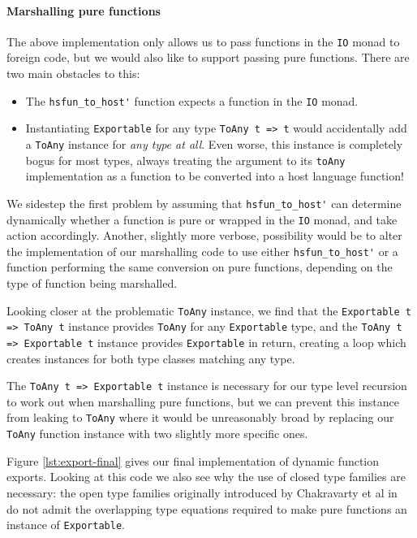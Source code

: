 \documentclass{sigplanconf}
\begin{document}
\paragraph{Marshalling pure functions}
The above implementation only allows us to pass functions in the \lstinline!IO!
monad to foreign code, but we would also like to support passing pure
functions. There are two main obstacles to this:

\begin{itemize}
\item
  The \lstinline!hsfun_to_host'! function expects a function in the
  \lstinline!IO! monad.
\item
  Instantiating \lstinline!Exportable! for any type \lstinline!ToAny t => t!
  would accidentally add a \lstinline!ToAny! instance for
  \emph{any type at all}.
  Even worse, this instance is completely bogus for most types, always treating
  the argument to its \lstinline!toAny! implementation as a function to be
  converted into a host language function!
\end{itemize}

We sidestep the first problem by assuming that \lstinline!hsfun_to_host'!
can determine dynamically whether a function is pure or wrapped in the
\lstinline!IO! monad, and take action accordingly.
Another, slightly more verbose, possibility would be to alter the
implementation of our marshalling code to use either
\lstinline!hsfun_to_host'! or a function performing the same conversion
on pure functions, depending on the type of function being marshalled.

Looking closer at the problematic \lstinline!ToAny! instance, we find that
the \lstinline!Exportable t => ToAny t! instance provides
\lstinline!ToAny! for any \lstinline!Exportable! type, and the
\lstinline!ToAny t => Exportable t! instance provides \lstinline!Exportable! in
return, creating a loop which creates instances for both type classes
matching any type.

The \lstinline!ToAny t => Exportable t! instance is necessary
for our type level recursion to work out when marshalling pure functions,
but we can prevent this instance from leaking to \lstinline!ToAny! where it
would be unreasonably broad by replacing our \lstinline!ToAny! function
instance with two slightly more specific ones.

Figure \ref{lst:export-final} gives our final implementation of dynamic
function exports.
Looking at this code we also see why the use of closed type families are
necessary: the open type families originally introduced by Chakravarty et al
in\ \cite{typefamilies} do not admit the overlapping type equations required
to make pure functions an instance of \lstinline!Exportable!.
\end{document}
